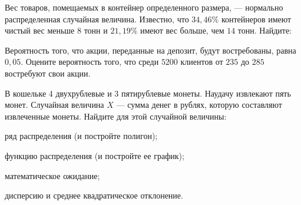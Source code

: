 \vfil

\begin{zkrPlain}{25}\noindent 
	Вес товаров, помещаемых в контейнер определенного размера, — нормально распределенная случайная величина. Известно, что $34{,}46\%$ контейнеров имеют чистый вес меньше $8$ тонн и $21{,}19\%$ имеют вес больше, чем $14$ тонн. Найдите: \par {}
 
\end{zkrPlain}

\vfil

\begin{zkrPlain}{25}\noindent 
	Вероятность того, что акции, переданные на депозит, будут востребованы, равна $ 0{,}05 $. Оцените вероятность того, что среди $ 5200 $ клиентов от $ 235 $ до $ 285 $ востребуют свои акции.
 
\end{zkrPlain}

\newpage\setcounter{zad}{0}\setcounter{footnote}{0}



\begin{zkrPlain}{25}\noindent 
	В кошельке 4 двухрублевые и 3 пятирублевые монеты. Наудачу извлекают пять монет. Случайная величина $X$ --- сумма денег в рублях, которую составляют извлеченные монеты.  Найдите для этой случайной величины: \par \smallskip\small{ \par \zz ряд распределения (и постройте полигон); \par \zz функцию распределения (и постройте ее график); \par \zz математическое ожидание; \par \zz дисперсию и среднее квадратическое отклонение.\par \par}
 
\end{zkrPlain}

\vfil

